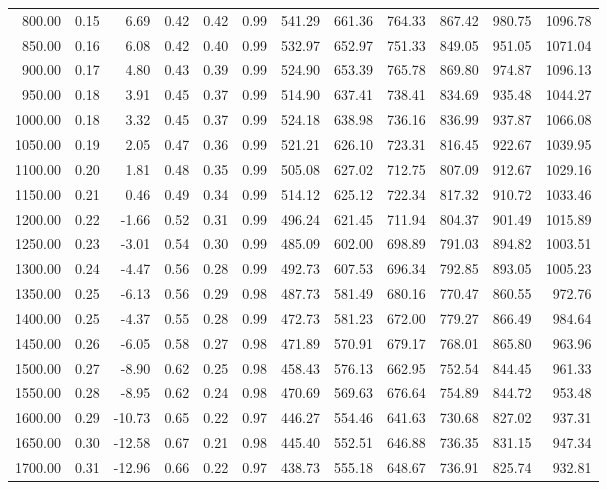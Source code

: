 \begin{table}[ht]
\begin{tabular}{rrrrrrrrrrrr}
  800.00 & 0.15 & 6.69 & 0.42 & 0.42 & 0.99 & 541.29 & 661.36 & 764.33 & 867.42 & 980.75 & 1096.78 \\ 
  850.00 & 0.16 & 6.08 & 0.42 & 0.40 & 0.99 & 532.97 & 652.97 & 751.33 & 849.05 & 951.05 & 1071.04 \\ 
  900.00 & 0.17 & 4.80 & 0.43 & 0.39 & 0.99 & 524.90 & 653.39 & 765.78 & 869.80 & 974.87 & 1096.13 \\ 
  950.00 & 0.18 & 3.91 & 0.45 & 0.37 & 0.99 & 514.90 & 637.41 & 738.41 & 834.69 & 935.48 & 1044.27 \\ 
  1000.00 & 0.18 & 3.32 & 0.45 & 0.37 & 0.99 & 524.18 & 638.98 & 736.16 & 836.99 & 937.87 & 1066.08 \\ 
  1050.00 & 0.19 & 2.05 & 0.47 & 0.36 & 0.99 & 521.21 & 626.10 & 723.31 & 816.45 & 922.67 & 1039.95 \\ 
  1100.00 & 0.20 & 1.81 & 0.48 & 0.35 & 0.99 & 505.08 & 627.02 & 712.75 & 807.09 & 912.67 & 1029.16 \\ 
  1150.00 & 0.21 & 0.46 & 0.49 & 0.34 & 0.99 & 514.12 & 625.12 & 722.34 & 817.32 & 910.72 & 1033.46 \\ 
  1200.00 & 0.22 & -1.66 & 0.52 & 0.31 & 0.99 & 496.24 & 621.45 & 711.94 & 804.37 & 901.49 & 1015.89 \\ 
  1250.00 & 0.23 & -3.01 & 0.54 & 0.30 & 0.99 & 485.09 & 602.00 & 698.89 & 791.03 & 894.82 & 1003.51 \\ 
  1300.00 & 0.24 & -4.47 & 0.56 & 0.28 & 0.99 & 492.73 & 607.53 & 696.34 & 792.85 & 893.05 & 1005.23 \\ 
  1350.00 & 0.25 & -6.13 & 0.56 & 0.29 & 0.98 & 487.73 & 581.49 & 680.16 & 770.47 & 860.55 & 972.76 \\ 
  1400.00 & 0.25 & -4.37 & 0.55 & 0.28 & 0.99 & 472.73 & 581.23 & 672.00 & 779.27 & 866.49 & 984.64 \\ 
  1450.00 & 0.26 & -6.05 & 0.58 & 0.27 & 0.98 & 471.89 & 570.91 & 679.17 & 768.01 & 865.80 & 963.96 \\ 
  1500.00 & 0.27 & -8.90 & 0.62 & 0.25 & 0.98 & 458.43 & 576.13 & 662.95 & 752.54 & 844.45 & 961.33 \\ 
  1550.00 & 0.28 & -8.95 & 0.62 & 0.24 & 0.98 & 470.69 & 569.63 & 676.64 & 754.89 & 844.72 & 953.48 \\ 
  1600.00 & 0.29 & -10.73 & 0.65 & 0.22 & 0.97 & 446.27 & 554.46 & 641.63 & 730.68 & 827.02 & 937.31 \\ 
  1650.00 & 0.30 & -12.58 & 0.67 & 0.21 & 0.98 & 445.40 & 552.51 & 646.88 & 736.35 & 831.15 & 947.34 \\ 
  1700.00 & 0.31 & -12.96 & 0.66 & 0.22 & 0.97 & 438.73 & 555.18 & 648.67 & 736.91 & 825.74 & 932.81 \\ 

\end{tabular}
\end{table}
